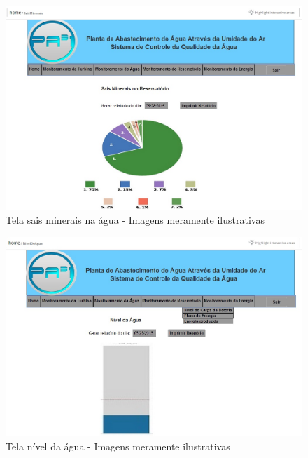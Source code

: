 \begin{center}
\begin{figure}[!ht]
\centering
\includegraphics[scale=0.5]{figuras/11}
\caption[Tela sais minerais na água]{Tela sais minerais na água - Imagens meramente ilustrativas}
\label{tela_sais_minerais_na_agua}
\end{figure}
\clearpage

\begin{figure}[!ht]
\centering
\includegraphics[scale=0.5]{figuras/12}
\caption[Tela nível da água]{Tela nível da água - Imagens meramente ilustrativas}
\label{tela_nivel_da_agua}
\end{figure}



\end{center}

